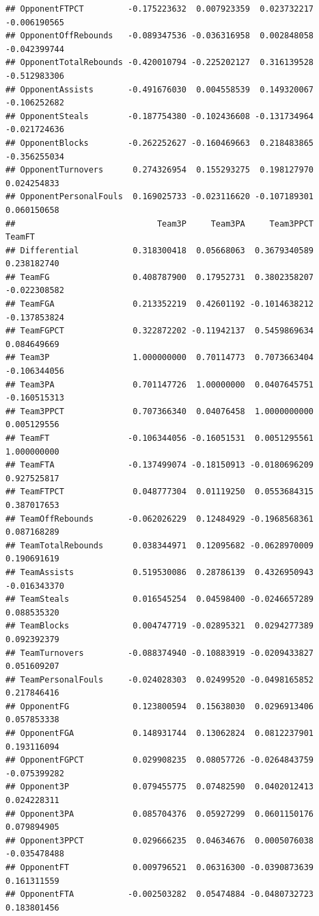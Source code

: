 \documentclass[]{book}
\begin{document}
\begin{verbatim}
## OpponentFTPCT         -0.175223632  0.007923359  0.023732217 -0.006190565
## OpponentOffRebounds   -0.089347536 -0.036316958  0.002848058 -0.042399744
## OpponentTotalRebounds -0.420010794 -0.225202127  0.316139528 -0.512983306
## OpponentAssists       -0.491676030  0.004558539  0.149320067 -0.106252682
## OpponentSteals        -0.187754380 -0.102436608 -0.131734964 -0.021724636
## OpponentBlocks        -0.262252627 -0.160469663  0.218483865 -0.356255034
## OpponentTurnovers      0.274326954  0.155293275  0.198127970  0.024254833
## OpponentPersonalFouls  0.169025733 -0.023116620 -0.107189301  0.060150658
##                             Team3P     Team3PA     Team3PPCT       TeamFT
## Differential           0.318300418  0.05668063  0.3679340589  0.238182740
## TeamFG                 0.408787900  0.17952731  0.3802358207 -0.022308582
## TeamFGA                0.213352219  0.42601192 -0.1014638212 -0.137853824
## TeamFGPCT              0.322872202 -0.11942137  0.5459869634  0.084649669
## Team3P                 1.000000000  0.70114773  0.7073663404 -0.106344056
## Team3PA                0.701147726  1.00000000  0.0407645751 -0.160515313
## Team3PPCT              0.707366340  0.04076458  1.0000000000  0.005129556
## TeamFT                -0.106344056 -0.16051531  0.0051295561  1.000000000
## TeamFTA               -0.137499074 -0.18150913 -0.0180696209  0.927525817
## TeamFTPCT              0.048777304  0.01119250  0.0553684315  0.387017653
## TeamOffRebounds       -0.062026229  0.12484929 -0.1968568361  0.087168289
## TeamTotalRebounds      0.038344971  0.12095682 -0.0628970009  0.190691619
## TeamAssists            0.519530086  0.28786139  0.4326950943 -0.016343370
## TeamSteals             0.016545254  0.04598400 -0.0246657289  0.088535320
## TeamBlocks             0.004747719 -0.02895321  0.0294277389  0.092392379
## TeamTurnovers         -0.088374940 -0.10883919 -0.0209433827  0.051609207
## TeamPersonalFouls     -0.024028303  0.02499520 -0.0498165852  0.217846416
## OpponentFG             0.123800594  0.15638030  0.0296913406  0.057853338
## OpponentFGA            0.148931744  0.13062824  0.0812237901  0.193116094
## OpponentFGPCT          0.029908235  0.08057726 -0.0264843759 -0.075399282
## Opponent3P             0.079455775  0.07482590  0.0402012413  0.024228311
## Opponent3PA            0.085704376  0.05927299  0.0601150176  0.079894905
## Opponent3PPCT          0.029666235  0.04634676  0.0005076038 -0.035478488
## OpponentFT             0.009796521  0.06316300 -0.0390873639  0.161311559
## OpponentFTA           -0.002503282  0.05474884 -0.0480732723  0.183801456

\end{verbatim}
\end{document}
